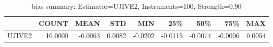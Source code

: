 \begin{table}[ht]
\centering
\caption{bias summary: Estimator=UJIVE2, Instruments=100, Strength=0.90}
\begin{tabular}{lrrrrrrrr}
\toprule
 & COUNT & MEAN & STD & MIN & 25\% & 50\% & 75\% & MAX \\
\midrule
UJIVE2 & 10.0000 & -0.0063 & 0.0082 & -0.0202 & -0.0115 & -0.0074 & -0.0006 & 0.0054 \\
\bottomrule
\end{tabular}
\end{table}
